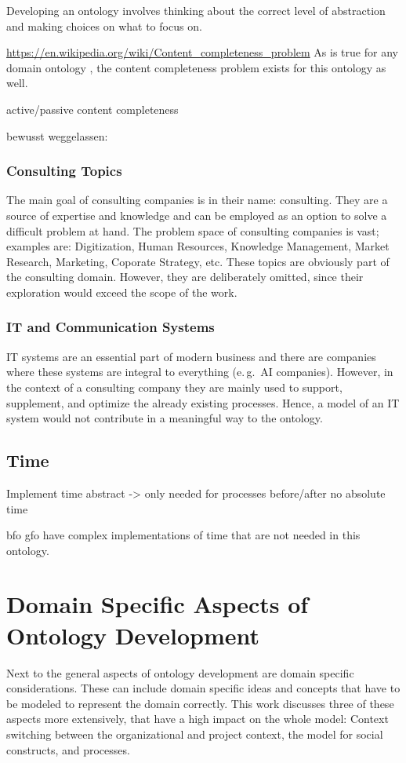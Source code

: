 \documentclass[a4paper, DIV=13, BCOR=0cm]{scrbook}
\newcommand{\eg}{e.\,g.\ }
\begin{document}
Developing an ontology involves thinking about the correct level of abstraction and making choices on what to focus on.

\url{https://en.wikipedia.org/wiki/Content_completeness_problem}
As is true for any domain ontology \cite{CN}, the content completeness problem exists for this ontology as well.

active/passive content completeness

bewusst weggelassen:
\subsubsection{Consulting Topics}
The main goal of consulting companies is in their name: consulting. They are a source of expertise and knowledge and can be employed as an option to solve a difficult problem at hand. The problem space of consulting companies is vast; examples are: Digitization, Human Resources, Knowledge Management, Market Research, Marketing, Coporate Strategy, etc. These topics are obviously part of the consulting domain. However, they are deliberately omitted, since their exploration would exceed the scope of the work.

\subsubsection{IT and Communication Systems}
IT systems are an essential part of modern business and there are companies where these systems are integral to everything (\eg AI companies). However, in the context of a consulting company they are mainly used to support, supplement, and optimize the already existing processes. Hence, a model of an IT system would not contribute in a meaningful way to the ontology.

\subsection{Time}
\label{time}
Implement time abstract -> only needed for processes before/after
no absolute time

\gls{bfo} \gls{gfo} have complex implementations of time that are not needed in this ontology.

\section{Domain Specific Aspects of Ontology Development }
\label{domain-aspects}
Next to the general aspects of ontology development are domain specific considerations. These can include domain specific ideas and concepts that have to be modeled to represent the domain correctly. This work discusses three of these aspects more extensively, that have a high impact on the whole model: Context switching between the organizational and project context, the model for social constructs, and processes.
\end{document}
